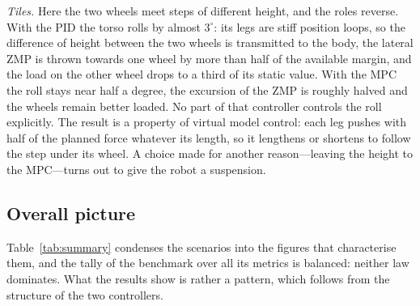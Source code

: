 \documentclass[11pt,a4paper]{article}
\begin{document}
\emph{Tiles.} Here the two wheels meet steps of different height, and the roles reverse. With the PID the torso
rolls by almost $3^\circ$: its legs are stiff position loops, so the difference of height between the two
wheels is transmitted to the body, the lateral ZMP is thrown towards one wheel by more than half of the available
margin, and the load on the other wheel drops to a third of its static value. With the MPC the roll stays near half
a degree, the excursion of the ZMP is roughly halved and the wheels remain better loaded. No part of that controller
controls the roll explicitly. The result is a property of virtual model control: each leg pushes with half of the
planned force whatever its length, so it lengthens or shortens to follow the step under its wheel. A choice made
for another reason---leaving the height to the MPC---turns out to give the robot a suspension.

\subsection{Overall picture}

Table~\ref{tab:summary} condenses the scenarios into the figures that characterise them, and the tally of the
benchmark over all its metrics is balanced: neither law dominates. What the results show is rather a pattern,
which follows from the structure of the two controllers.
\end{document}
